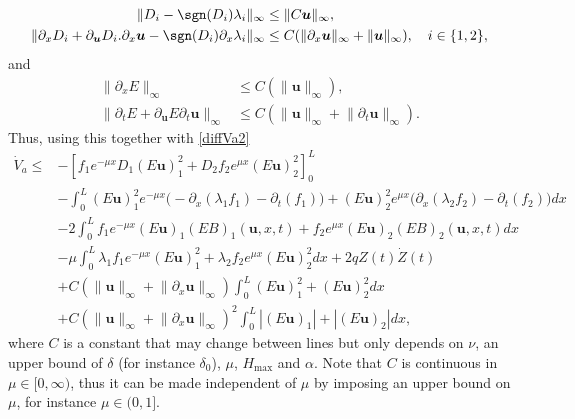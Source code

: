 \begin{align*}
\lVert D_{i}-\sgn(D_{i})\lambda_{i}\rVert_{\infty}&\leq \lVert C\boldsymbol{u}\rVert_{\infty},
\\
\lVert\partial_{x}D_{i}+\partial_{\boldsymbol{u}}D_{i}.\partial_{x}\boldsymbol{u}-\sgn(D_{i})\partial_{x}\lambda_{i}\rVert_{\infty}&\leq C(\lVert \partial_{x}\boldsymbol{u}\rVert_{\infty}+\lVert \boldsymbol{u}\rVert_{\infty}),\quad i\in\{1,2\},
\end{align*}
and
\begin{align*}
\lVert\partial_{x}E\rVert_{\infty}&\leq C(\lVert \boldsymbol{u}\rVert_{\infty}),\\
\lVert\partial_{t}E+\partial_{\boldsymbol{u}}E\partial_{t}\boldsymbol{u}\rVert_{\infty}&\leq C(\lVert \boldsymbol{u}\rVert_{\infty}+\lVert \partial_{t} \boldsymbol{u}\rVert_{\infty}).
\end{align*}
Thus, using this together with \eqref{diffVa2}
\begin{equation*}
\begin{split}
\dot V_{a}\leq& -\left[f_{1}e^{-\mu x}D_{1}(E\boldsymbol{u})_{1}^{2}+D_{2}f_{2}e^{\mu x}(E\boldsymbol{u})_{2}^{2}\right]_{0}^{L}\\
&-\int_{0}^{L}(E\boldsymbol{u})_{1}^{2}e^{-\mu x}\bigl(-\partial_{x}(\lambda_{1}f_{1})-\partial_{t}(f_{1})\bigr)+(E\boldsymbol{u})_{2}^{2}e^{\mu x}\bigl(\partial_{x}(\lambda_{2}f_{2})-\partial_{t}(f_{2})\bigr)dx\\
&-2\int_{0}^{L}f_{1}e^{-\mu x}(E\boldsymbol{u})_{1}(EB)_{1}(\boldsymbol{u},x,t)+f_{2}e^{\mu x}(E\boldsymbol{u})_{2}(EB)_{2}(\boldsymbol{u},x,t)dx\\
&-\mu\int_{0}^{L}\lambda_{1}f_{1}e^{-\mu x}(E\boldsymbol{u})_{1}^{2}+\lambda_{2}f_{2}e^{\mu x}(E\boldsymbol{u})_{2}^{2}dx
+2qZ(t)\dot Z(t)\\
&+C\left(\lVert \boldsymbol{u}\rVert_{\infty}+\lVert \partial_{x} \boldsymbol{u}\rVert_{\infty}\right)\int_{0}^{L}(E\boldsymbol{u})_{1}^{2}+(E\boldsymbol{u})_{2}^{2} dx\\
&+C\left(\lVert \boldsymbol{u}\rVert_{\infty}+\lVert \partial_{x} \boldsymbol{u}\rVert_{\infty}\right)^{2}\int_{0}^{L}|(E\boldsymbol{u})_{1}|+|(E\boldsymbol{u})_{2}|dx,
\end{split}
\end{equation*}
where $C$ is a constant that may change between lines but
only depends on $\nu$, an upper bound of $\delta$ (for instance $\delta_{0}$), $\mu$, $H_{\max}$ and $\alpha$. Note that $C$ is continuous in $\mu\in[0,\infty)$, thus it can be made independent of $\mu$ by imposing an upper bound on $\mu$, for instance $\mu\in(0,1]$.
